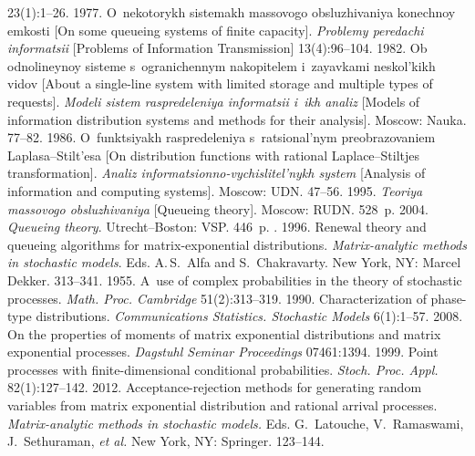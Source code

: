 \begin{multicols}{2}
{{\begin{thebibliography}{99}
23(1):1--26.
   1977. O~nekotorykh sistemakh massovogo 
obsluzhivaniya konechnoy emkosti [On some queueing systems of finite capacity]. \textit{Problemy 
peredachi informatsii} [Problems of Information Transmission] 13(4):96--104.
   1982. Ob odnolineynoy sisteme s~ogranichennym nakopitelem i~zayavkami 
neskol'kikh vidov [About a single-line system with limited storage and multiple types of requests]. 
\textit{Modeli sistem raspredeleniya informatsii i~ikh analiz} [Models of information distribution 
systems and methods for their analysis]. Moscow: Nauka. 77--82.
   1986. O~funktsiyakh raspredeleniya s~ratsio\-nal'nym preobrazovaniem  
Laplasa--Stilt'esa [On distribu\-tion functions with rational Laplace--Stiltjes transformation]. \textit{Analiz 
  informatsionno-vychislitel'nykh \mbox{system}}
   [\mbox{Analysis} of information and computing systems]. Moscow: 
UDN. 47--56.
   1995. \textit{Teoriya massovogo obsluzhivaniya} 
[Queueing theory]. Moscow: RUDN. 528~p.
   2004. \textit{Queueing 
theory}. Utrecht--Boston: VSP. 446~p.
  . 1996. Renewal theory and queueing algorithms for 
  matrix-exponential distributions. \textit{Matrix-analytic methods in stochastic models}. 
  Eds. A.\,S.~Alfa and 
S.~Chakravarty. New York, NY: Marcel Dekker. 313--341.
   1955. A~use of complex probabilities in the theory of stochastic processes. 
\textit{Math. Proc. Cambridge} 51(2):313--319.
   1990. Characterization of phase-type distributions. \textit{Communications 
Statistics. Stochastic Models} 6(1):1--57.
   2008. On the properties of 
moments of matrix exponential distributions and matrix exponential processes. 
\textit{Dagstuhl Seminar Proceedings} 07461:1394.
   1999. Point processes with finite-dimensional conditional 
probabilities. \textit{Stoch. Proc. Appl.} 82(1):127--142.
   2012. Acceptance-rejection methods for generating random 
variables from matrix exponential distribution and rational arrival processes. \textit{Matrix-analytic 
methods in stochastic models.} Eds. G.~Latouche, V.~Ramaswami, J.~Sethuraman, \textit{et al.} New York, NY: Springer. 123--144.

\end{thebibliography}}}
\end{multicols}
